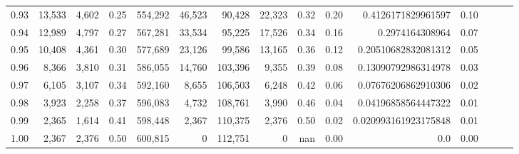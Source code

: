 \begin{tabular}{rrrrrrrrrrrrrrr}
0.93 &  13,533 &  4,602 &  0.25 &  554,292 &   46,523 &   90,428 &   22,323 &  0.32 &  0.20 &    0.4126171829961597 &      0.10 \\
0.94 &  12,989 &  4,797 &  0.27 &  567,281 &   33,534 &   95,225 &   17,526 &  0.34 &  0.16 &       0.2974164308964 &      0.07 \\
0.95 &  10,408 &  4,361 &  0.30 &  577,689 &   23,126 &   99,586 &   13,165 &  0.36 &  0.12 &   0.20510682832081312 &      0.05 \\
0.96 &   8,366 &  3,810 &  0.31 &  586,055 &   14,760 &  103,396 &    9,355 &  0.39 &  0.08 &   0.13090792986314978 &      0.03 \\
0.97 &   6,105 &  3,107 &  0.34 &  592,160 &    8,655 &  106,503 &    6,248 &  0.42 &  0.06 &   0.07676206862910306 &      0.02 \\
0.98 &   3,923 &  2,258 &  0.37 &  596,083 &    4,732 &  108,761 &    3,990 &  0.46 &  0.04 &   0.04196858564447322 &      0.01 \\
0.99 &   2,365 &  1,614 &  0.41 &  598,448 &    2,367 &  110,375 &    2,376 &  0.50 &  0.02 &  0.020993161923175848 &      0.01 \\
1.00 &   2,367 &  2,376 &  0.50 &  600,815 &        0 &  112,751 &        0 &   nan &  0.00 &                   0.0 &      0.00 \\
\bottomrule
\end{tabular}
